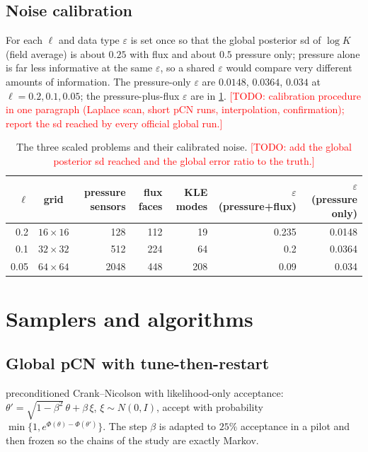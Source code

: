\documentclass[11pt]{article}
\newcommand{\todo}[1]{\textcolor{red}{[TODO: #1]}}
\begin{document}
\subsection{Noise calibration}
For each $\ell$ and data type $\varepsilon$ is set once so that the global posterior sd of $\log K$ (field average) is about $0.25$ with flux and about $0.5$ pressure only; pressure alone is far less informative at the same $\varepsilon$, so a shared $\varepsilon$ would compare very different amounts of information. The pressure-only $\varepsilon$ are $0.0148$, $0.0364$, $0.034$ at $\ell=0.2,0.1,0.05$; the pressure-plus-flux $\varepsilon$ are in \cref{tab:design}. \todo{calibration procedure in one paragraph (Laplace scan, short pCN runs, interpolation, confirmation); report the sd reached by every official global run.}

\begin{table}[h]\centering
\begin{tabular}{rcrrrrr}
\toprule
$\ell$ & grid & pressure sensors & flux faces & KLE modes & $\varepsilon$ (pressure+flux) & $\varepsilon$ (pressure only)\\
\midrule
0.2 & $16\times16$ & 128 & 112 & 19 & 0.235 & 0.0148\\
0.1 & $32\times32$ & 512 & 224 & 64 & 0.2 & 0.0364\\
0.05 & $64\times64$ & 2048 & 448 & 208 & 0.09 & 0.034\\
\bottomrule
\end{tabular}
\caption{The three scaled problems and their calibrated noise. \todo{add the global posterior sd reached and the global error ratio to the truth.}}\label{tab:design}
\end{table}

\section{Samplers and algorithms}\label{sec:methods}
\subsection{Global pCN with tune-then-restart}
preconditioned Crank--Nicolson with likelihood-only acceptance: $\theta'=\sqrt{1-\beta^2}\,\theta+\beta\,\xi$, $\xi\sim N(0,I)$, accept with probability $\min\{1,e^{\Phi(\theta)-\Phi(\theta')}\}$. The step $\beta$ is adapted to $25\%$ acceptance in a pilot and then frozen so the chains of the study are exactly Markov.
\end{document}
